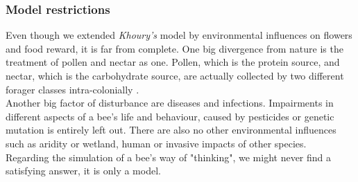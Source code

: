 	\subsubsection{Model restrictions}
	Even though we extended \textit{Khoury's} model by environmental influences on flowers and food reward, it is far from complete. One big divergence from nature is the treatment of pollen and nectar as one. Pollen, which is the protein source, and nectar, which is the carbohydrate source, are actually collected by two different forager classes intra-colonially \cite{schmickl07}.\\  Another big factor of disturbance are diseases and infections. Impairments in different aspects of a bee's life and behaviour, caused by pesticides or genetic mutation is entirely left out. There are also no other environmental influences such as aridity or wetland, human or invasive impacts of other species. \\
	Regarding the simulation of a bee's way of "thinking", we might never find a satisfying answer, it is only a model.   
	
